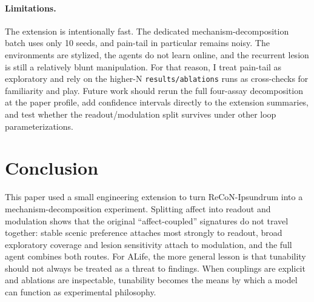 \documentclass[letterpaper]{article}
\begin{document}
\paragraph{Limitations.} The extension is intentionally fast. The dedicated mechanism-decomposition batch uses only 10 seeds, and pain-tail in particular remains noisy. The environments are stylized, the agents do not learn online, and the recurrent lesion is still a relatively blunt manipulation. For that reason, I treat pain-tail as exploratory and rely on the higher-N \texttt{results/ablations} runs as cross-checks for familiarity and play. Future work should rerun the full four-assay decomposition at the paper profile, add confidence intervals directly to the extension summaries, and test whether the readout/modulation split survives under other loop parameterizations.

\section{Conclusion}
This paper used a small engineering extension to turn ReCoN-Ipsundrum into a mechanism-decomposition experiment. Splitting affect into readout and modulation shows that the original ``affect-coupled'' signatures do not travel together: stable scenic preference attaches most strongly to readout, broad exploratory coverage and lesion sensitivity attach to modulation, and the full agent combines both routes. For ALife, the more general lesson is that tunability should not always be treated as a threat to findings. When couplings are explicit and ablations are inspectable, tunability becomes the means by which a model can function as experimental philosophy.
\end{document}
